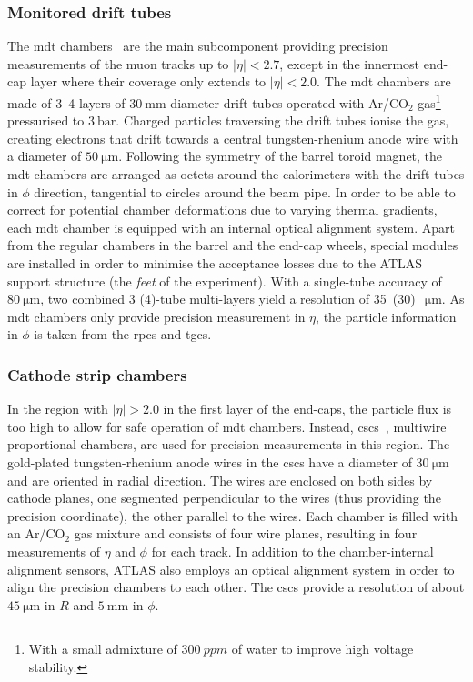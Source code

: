 \subsubsection{Monitored drift tubes}

The \gls{mdt} chambers~\cite{Aad:2008zzm} are the main subcomponent providing precision measurements of the muon tracks up to $\vert\eta\vert <2.7$, except in the innermost end-cap layer where their coverage only extends to $\vert\eta\vert <2.0$. The \gls{mdt} chambers are made of 3--4 layers of $\SI{30}{\milli\meter}$ diameter drift tubes operated with Ar/CO$_2$ gas\footnote{With a small admixture of $\SI{300}{ppm}$ of water to improve high voltage stability.} pressurised to $\SI{3}{\bar}$. Charged particles traversing the drift tubes ionise the gas, creating electrons that drift towards a central tungsten-rhenium anode wire with a diameter of $\SI{50}{\micro\meter}$. Following the symmetry of the barrel toroid magnet, the \gls{mdt} chambers are arranged as octets around the calorimeters with the drift tubes in $\phi$ direction, \ie tangential to circles around the beam pipe. In order to be able to correct for potential chamber deformations due to varying thermal gradients, each \gls{mdt} chamber is equipped with an internal optical alignment system. Apart from the regular chambers in the barrel and the end-cap wheels, special modules are installed in order to minimise the acceptance losses due to the ATLAS support structure (the \textit{feet} of the experiment). With a single-tube accuracy of $\SI{80}{\micro\meter}$, two combined 3 (4)-tube multi-layers yield a resolution of 35~(30)~$\SI{}{\micro\meter}$. As \gls{mdt} chambers only provide precision measurement in $\eta$, the particle information in $\phi$ is taken from the \glspl{rpc} and \glspl{tgc}.

\subsubsection{Cathode strip chambers}

In the region with $\vert\eta\vert > 2.0$ in the first layer of the end-caps, the particle flux is too high to allow for safe operation of \gls{mdt} chambers. Instead, \glspl{csc}~\cite{Aad:2008zzm}, multiwire proportional chambers, are used for precision measurements in this region. The gold-plated tungsten-rhenium anode wires in the \glspl{csc} have a diameter of $\SI{30}{\micro\meter}$ and are oriented in radial direction. The wires are enclosed on both sides by cathode planes, one segmented perpendicular to the wires (thus providing the precision coordinate), the other parallel to the wires. Each chamber is filled with an Ar/CO$_2$ gas mixture and consists of four wire planes, resulting in four measurements of $\eta$ and $\phi$ for each track. In addition to the chamber-internal alignment sensors, ATLAS also employs an optical alignment system in order to align the precision chambers to each other. The \glspl{csc} provide a resolution of about $\SI{45}{\micro\meter}$ in $R$ and $\SI{5}{\milli\meter}$ in $\phi$.

